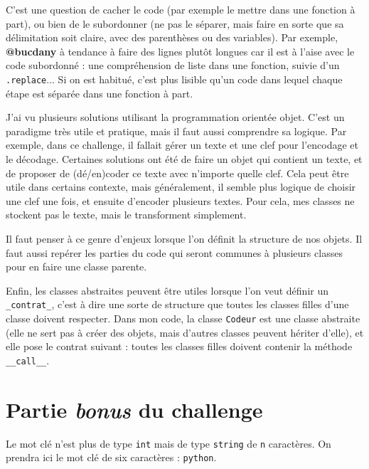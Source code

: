 C'est une question de cacher le code (par exemple le mettre dans une fonction à part), ou bien de le subordonner (ne pas le séparer, mais faire en sorte que sa délimitation soit claire, avec des parenthèses ou des variables). Par exemple, \textbf{@bucdany} à tendance à faire des lignes plutôt longues car il est à l'aise avec le code subordonné : une compréhension de liste dans une fonction, suivie d'un \texttt{.replace}... Si on est habitué, c'est plus lisible qu'un code dans lequel chaque étape est séparée dans une fonction à part.
\medskip

J'ai vu plusieurs solutions utilisant la programmation orientée objet. C'est un paradigme très utile et pratique, mais il faut aussi comprendre sa logique. Par exemple, dans ce challenge, il fallait gérer un texte et une clef pour l'encodage et le décodage. Certaines solutions ont été de faire un objet qui contient un texte, et de proposer de (dé/en)coder ce texte avec n'importe quelle clef. Cela peut être utile dans certains contexte, mais généralement, il semble plus logique de choisir une clef une fois, et ensuite d'encoder plusieurs textes. Pour cela, mes classes ne stockent pas le texte, mais le transforment simplement.
\medskip

Il faut penser à ce genre d'enjeux lorsque l'on définit la structure de nos objets. Il faut aussi repérer les parties du code qui seront communes à plusieurs classes pour en faire une classe parente.
\medskip

Enfin, les classes abstraites peuvent être utiles lorsque l'on veut définir un \\
\texttt{\_contrat\_}, c'est à dire une sorte de structure que toutes les classes filles d'une classe doivent respecter. Dans mon code, la classe \texttt{Codeur} est une classe abstraite (elle ne sert pas à créer des objets, mais d'autres classes peuvent hériter d'elle), et elle pose le contrat suivant : toutes les classes filles doivent contenir la méthode \texttt{\_\_call\_\_}.
\medskip

\section{Partie \textit{bonus} du challenge}
Le mot clé n'est plus de type \texttt{int} mais de type \texttt{string} de \texttt{n} caractères. On prendra ici le mot clé de six caractères : \texttt{python}.
\medskip

